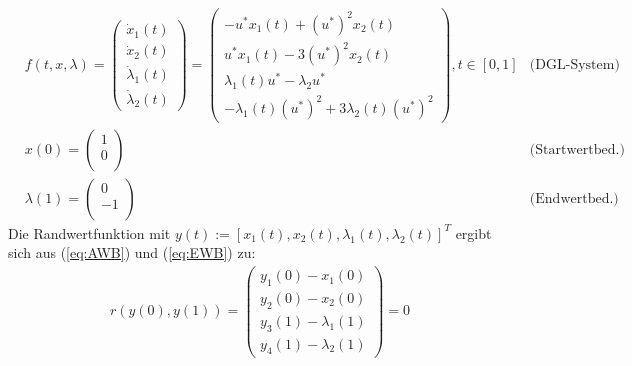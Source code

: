 \begin{align}
	&f(t,x,\lambda)=\left(\begin{array}{c}
		\dot{x}_1(t)\\
		\dot{x}_2(t)\\
		\dot{\lambda}_1(t)\\
		\dot{\lambda}_2(t)
	\end{array}\right) =         \left(\begin{array}{c}	-u^*x_1(t)+(u^*)^2x_2(t)\\ 
																											u^*x_1(t) - 3(u^*)^2x_2(t) \\
																											 \lambda_1(t) u^*  - \lambda_2 u^*\\
																											-\lambda_1(t) (u^*)^2  + 3 \lambda_2(t) (u^*)^2 
															 \end{array}\right), t \in [0,1] & \text{(DGL-System)}\\[10pt]
	& x(0) = \left(\begin{array}{c}
								1\\
								0\\
					 \end{array}\right)  & \text{(Startwertbed.)}\label{eq:AWB} \\[10pt] 
	& \lambda(1) = \left(\begin{array}{c}
								0\\
								-1\\
	\end{array}\right)  & \text{(Endwertbed.)} \label{eq:EWB}
\end{align}
Die Randwertfunktion mit $y(t) := [x_1(t), x_2(t), \lambda_1(t), \lambda_2(t)]^T$ ergibt sich aus (\ref{eq:AWB}) und (\ref{eq:EWB}) zu:
\begin{align}
	r(y(0),y(1)) = 	\left(\begin{array}{c}
											y_1(0) - x_1(0)\\
											y_2(0) - x_2(0)\\ 
											y_3(1)- \lambda_1(1)\\
											y_4(1)- \lambda_2(1)
									\end{array}\right) = 0
\end{align}

